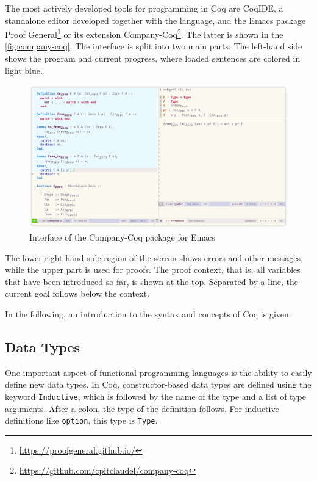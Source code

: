 \documentclass[a4paper, 11pt, fleqn, twoside, abstract=on]{scrreprt}
\newcommand{\cinl}[1]{\texttt{#1}}
\begin{document}
The most actively developed tools for programming in Coq are CoqIDE, a standalone editor developed together with the language, and the Emacs package Proof General\footnote{\url{https://proofgeneral.github.io/}} or its extension Company-Coq\footnote{\url{https://github.com/cpitclaudel/company-coq}}.
The latter is shown in the \autoref{fig:company-coq}.
The interface is split into two main parts: The left-hand side shows the program and current progress, where loaded sentences are colored in light blue.

\begin{figure}
\begin{center}
\includegraphics[width=\textwidth]{img/coq.png}
\end{center}
\caption{Interface of the Company-Coq package for Emacs}
\label{fig:company-coq}
\end{figure}


The lower right-hand side region of the screen shows errors and other messages, while the upper part is used for proofs.
The proof context, that is, all variables that have been introduced so far, is shown at the top.
Separated by a line, the current goal follows below the context.

In the following, an introduction to the syntax and concepts of Coq is given.

\subsection{Data Types}
\label{subsec:coqdatatypes}
One important aspect of functional programming languages is the ability to easily define new data types.
In Coq, constructor-based data types are defined using the keyword \cinl{Inductive}, which is followed by the name of the type and a list of type arguments.
After a colon, the type of the definition follows.
For inductive definitions like \cinl{option}, this type is \cinl{Type}.
\end{document}
